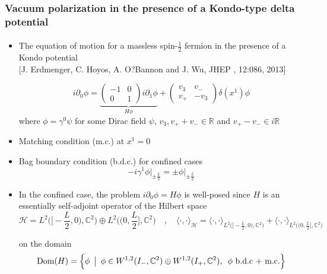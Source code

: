 \documentclass[english]{beamer}
\begin{document}
\begin{frame}[shrink=30]
\frametitle{\small{Vacuum polarization in the presence of a Kondo-type delta potential}}
\framesubtitle{}
\begin{itemize}
%
\item<1-> 
The equation of motion for a massless spin-$\frac 1 2$ fermion in the presence of a Kondo potential \\
\tiny\color{blue}[J. Erdmenger, C. Hoyos, A. O?Bannon and J. Wu, JHEP
, 12:086, 2013]\color{black}\normalsize

\begin{equation*}
i \partial_0 \phi = 
\underbrace{\begin{pmatrix} 
-1 & 0 \\
0 & 1 
\end{pmatrix} i \partial_1 \phi }_{H\phi}+
\begin{pmatrix}
v_3 & v_- \\
v_+ & -v_3
\end{pmatrix} \delta(x^1) \phi
\end{equation*}
where $\phi = \gamma^0\psi$ for some Dirac field $\psi$,  $v_3, v_+ + v_- \in \mathbb{R}$ and $ v_+ - v_-\in i \mathbb{R}$
%
\item<2-> Matching condition (m.c.) at $x^1 = 0$ 
%
\item<3-> Bag boundary condition (b.d.c.) for confined cases 
\begin{equation*}
- i\gamma^1 \phi \Big\vert_{\pm \frac{L}{2}} = \pm \phi \Big\vert_{\pm \frac{L}{2}}
\end{equation*}

%
\item<4-> In the confined case, the problem $i\partial_0\phi = H\phi$ is well-posed since $H$ is an essentially self-adjoint operator of the Hilbert space
\begin{equation*}
\mathcal{H} = L^{2}\Big(\big[-\frac L 2, 0\big), \mathbb{C}^2\Big) \oplus L^{2}\Big(\big(0,\frac L 2\big], \mathbb{C}^2\Big) 
\quad,\quad
\langle \cdot, \cdot\rangle_{\mathcal{H} } = \langle \cdot, \cdot\rangle_{L^{2}\big(\big[-\frac L 2, 0\big), \mathbb{C}^2\big)} +\langle \cdot, \cdot\rangle_{L^{2}\big(\big(0,\frac L 2\big], \mathbb{C}^2\big)}
\end{equation*}

 on the domain
\begin{equation*}
\mathrm{Dom}(H) = \Big \{\phi \enskip \big\vert \enskip \phi \in W^{1,2}(I_-, \mathbb{C}^2) \oplus W^{1,2}(I_+, \mathbb{C}^2), \enskip \phi \textrm{ b.d.c + m.c.} \Big \}
\end{equation*} 


\end{itemize}
\end{frame}
\end{document}
